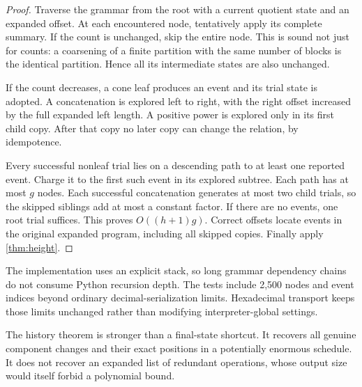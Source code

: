 \begin{proof}
Traverse the grammar from the root with a current quotient state and an
expanded offset. At each encountered node, tentatively apply its complete
summary. If the count is unchanged, skip the entire node. This is sound
not just for counts: a coarsening of a finite partition with the same number
of blocks is the identical partition. Hence all its intermediate states
are also unchanged.

If the count decreases, a cone leaf produces an event and its trial state
is adopted. A concatenation is explored left to right, with the right
offset increased by the full expanded left length. A positive power is
explored only in its first child copy. After that copy no later copy can
change the relation, by idempotence.

Every successful nonleaf trial lies on a descending path to at least one
reported event. Charge it to the first such event in its explored subtree.
Each path has at most $g$ nodes. Each successful concatenation generates at
most two child trials, so the skipped siblings add at most a constant
factor. If there are no events, one root trial suffices. This proves
$O((h+1)g)$. Correct offsets locate events in the original expanded program,
including all skipped copies. Finally apply \cref{thm:height}.
\end{proof}

The implementation uses an explicit stack, so long grammar dependency
chains do not consume Python recursion depth. The tests include 2,500
nodes and event indices beyond ordinary decimal-serialization limits.
Hexadecimal transport keeps those limits unchanged rather than modifying
interpreter-global settings.

The history theorem is stronger than a final-state shortcut. It recovers
all genuine component changes and their exact positions in a potentially
enormous schedule. It does not recover an expanded list of redundant
operations, whose output size would itself forbid a polynomial bound.
